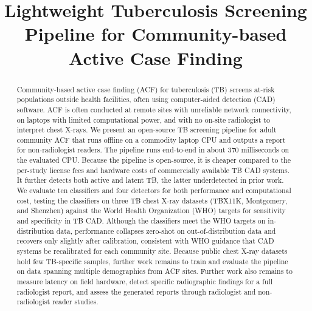 \documentclass[conference, letterpaper]{IEEEtran}
\begin{document}
\title{Lightweight Tuberculosis Screening Pipeline for Community-based Active Case Finding}

\IEEEoverridecommandlockouts
\author{
}

\maketitle

\begin{abstract}
Community-based active case finding (ACF) for tuberculosis (TB) screens at-risk populations outside health facilities, often using computer-aided detection (CAD) software. ACF is often conducted at remote sites with unreliable network connectivity, on laptops with limited computational power, and with no on-site radiologist to interpret chest X-rays. We present an open-source TB screening pipeline for adult community ACF that runs offline on a commodity laptop CPU and outputs a report for non-radiologist readers. The pipeline runs end-to-end in about 370 milliseconds on the evaluated CPU. Because the pipeline is open-source, it is cheaper compared to the per-study license fees and hardware costs of commercially available TB CAD systems. It further detects both active and latent TB, the latter underdetected in prior work. We evaluate ten classifiers and four detectors for both performance and computational cost, testing the classifiers on three TB chest X-ray datasets (TBX11K, Montgomery, and Shenzhen) against the World Health Organization (WHO) targets for sensitivity and specificity in TB CAD. Although the classifiers meet the WHO targets on in-distribution data, performance collapses zero-shot on out-of-distribution data and recovers only slightly after calibration, consistent with WHO guidance that CAD systems be recalibrated for each community site. Because public chest X-ray datasets hold few TB-specific samples, further work remains to train and evaluate the pipeline on data spanning multiple demographics from ACF sites. Further work also remains to measure latency on field hardware, detect specific radiographic findings for a full radiologist report, and assess the generated reports through radiologist and non-radiologist reader studies.
\end{abstract}
\end{document}
